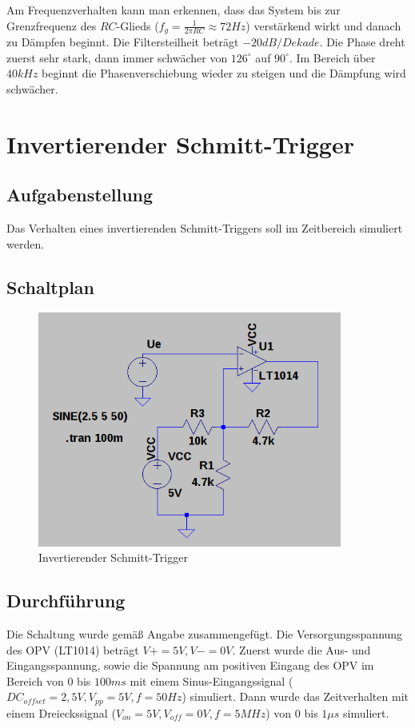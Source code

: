 \documentclass[12pt,a4paper,titlepage]{article}
\begin{document}
\noindent Am Frequenzverhalten kann man erkennen, dass das System bis zur Grenzfrequenz des $RC$-Glieds ($f_g = \frac{1}{2\pi RC} \approx 72Hz$) verst\"arkend wirkt und danach zu D\"ampfen beginnt. Die Filtersteilheit betr\"agt $-20dB/Dekade$. Die Phase dreht zuerst sehr stark, dann immer schw\"acher von $126^{\circ}$ auf $90^{\circ}$. Im Bereich \"uber $40kHz$ beginnt die Phasenverschiebung wieder zu steigen und die D\"ampfung wird schw\"acher.

\section{Invertierender Schmitt-Trigger}

\subsection{Aufgabenstellung}
Das Verhalten eines invertierenden Schmitt-Triggers soll im Zeitbereich simuliert werden.

\subsection{Schaltplan}
\begin{figure}[H]
  \centering
  \includegraphics[width=100mm]{schmitt_schaltung.png}
  \caption{Invertierender Schmitt-Trigger}
\end{figure}

\subsection{Durchf\"uhrung}
Die Schaltung wurde gem\"aß Angabe zusammengef\"ugt. Die Versorgungsspannung des OPV (LT1014) betr\"agt $V+=5V,V-=0V$. Zuerst wurde die Aus- und Eingangsspannung, sowie die Spannung am positiven Eingang des OPV im Bereich von $0$ bis $100ms$ mit einem Sinus-Eingangssignal ($DC_{offset} = 2,5V, V_{pp} = 5V, f = 50Hz$) simuliert. Dann wurde das Zeitverhalten mit einem Dreieckssignal ($V_{on} = 5V, V_{off} = 0V, f = 5MHz$) von $0$ bis $1\mu s$ simuliert.
\end{document}
